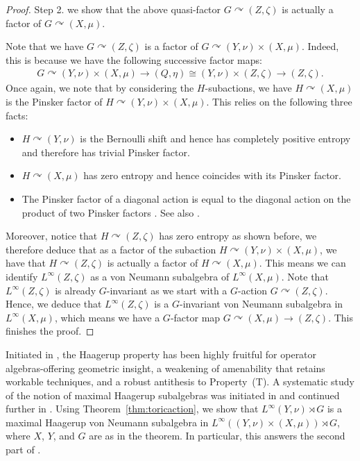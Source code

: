 \documentclass[12pt]{amsart}
\theoremstyle{definition}
\begin{document}
\begin{proof}
Step 2. we show that the above quasi-factor $G\curvearrowright (Z,\zeta)$ is actually a factor of $G\curvearrowright (X,\mu)$.

Note that we have $G\curvearrowright (Z,\zeta)$ is a factor of $G\curvearrowright (Y,\nu)\times (X,\mu)$. Indeed, this is because we have the following successive factor maps:
\begin{align*}
    G\curvearrowright (Y,\nu)\times (X,\mu)\rightarrow (Q,\eta)\cong (Y,\nu)\times (Z,\zeta)\rightarrow (Z,\zeta).
\end{align*}
Once again, we note that by considering the $H$-subactions, we have
$H\curvearrowright (X,\mu)$ is the Pinsker factor of $H\curvearrowright (Y,\nu)\times (X,\mu)$. This relies on the following three facts:
\begin{itemize}
\item $H\curvearrowright (Y,\nu)$ is the Bernoulli shift and hence has completely positive entropy and therefore has trivial Pinsker factor.
\item $H\curvearrowright (X,\mu)$ has zero entropy and hence coincides with its Pinsker factor.
\item The Pinsker factor of a diagonal action is equal to the diagonal action on the product of two Pinsker factors \cite{gtw}. See also \cites{dan,ben-pinsker}.
\end{itemize}
Moreover, notice that $H\curvearrowright(Z,\zeta)$ has zero entropy as shown before, we therefore deduce that as a factor of the subaction $H\curvearrowright (Y,\nu)\times (X,\mu)$, we have that
$H\curvearrowright (Z,\zeta)$ is actually a factor of $H\curvearrowright (X,\mu)$. This means we can identify $L^{\infty}(Z,\zeta)$ as a von Neumann subalgebra of $L^{\infty}(X,\mu)$. Note that $L^{\infty}(Z,\zeta)$ is already $G$-invariant as we start with a $G$-action $G\curvearrowright (Z,\zeta)$. Hence, we deduce that $L^{\infty}(Z,\zeta)$ is a $G$-invariant von Neumann subalgebra in $L^{\infty}(X,\mu)$, which means we have a $G$-factor map $G\curvearrowright (X,\mu)\rightarrow (Z,\zeta)$. This finishes the proof.
\end{proof}
Initiated in \cite{haagerup1978example}, the Haagerup property has been highly fruitful for operator algebras-offering geometric insight, a weakening of amenability that retains workable techniques, and a robust antithesis to Property~(T). A systematic study of the notion of maximal Haagerup subalgebras was initiated in \cite{jiangskalski} and continued further in \cite{jiang2021maximalsolo}. Using Theorem~\ref{thm:toricaction}, we show that $L^{\infty}(Y,\nu)\rtimes G$ is a maximal Haagerup von Neumann subalgebra in $L^{\infty}((Y,\nu)\times (X,\mu))\rtimes G$, where $X$, $Y$, and $G$ are as in the theorem. In particular, this answers the second part of \cite[Problem 5.2]{jiangskalski}.
\end{document}
